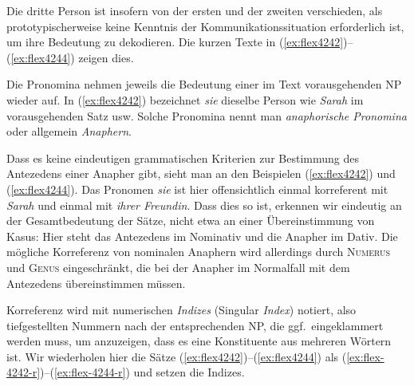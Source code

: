 Die dritte Person ist insofern von der ersten und der zweiten verschieden, als prototypischerweise keine Kenntnis der Kommunikationssituation erforderlich ist, um ihre Bedeutung zu dekodieren.
Die kurzen Texte in (\ref{ex:flex4242})--(\ref{ex:flex4244}) zeigen dies.

\begin{exe}
\end{exe}


Die Pronomina nehmen jeweils die Bedeutung einer im Text vorausgehenden NP wieder auf.
In (\ref{ex:flex4242}) bezeichnet \textit{sie} dieselbe Person wie \textit{Sarah} im vorausgehenden Satz usw.
Solche Pronomina nennt man \textit{anaphorische Pronomina} oder allgemein \textit{Anaphern}.


Dass es keine eindeutigen grammatischen Kriterien zur Bestimmung des Antezedens einer Anapher gibt, sieht man an den Beispielen (\ref{ex:flex4242}) und (\ref{ex:flex4244}).
Das Pronomen \textit{sie} ist hier offensichtlich einmal korreferent mit \textit{Sarah} und einmal mit \textit{ihrer Freundin}.
Dass dies so ist, erkennen wir eindeutig an der Gesamtbedeutung der Sätze, nicht etwa an einer Übereinstimmung von Kasus:
Hier steht das Antezedens im Nominativ und die Anapher im Dativ.
Die mögliche Korreferenz von nominalen Anaphern wird allerdings durch \textsc{Numerus} und \textsc{Genus} eingeschränkt, die bei der Anapher im Normalfall mit dem Antezedens übereinstimmen müssen.

Korreferenz wird mit numerischen \textit{Indizes} (Singular \textit{Index}) notiert, also tiefgestellten Nummern nach der entsprechenden NP, die ggf.\ eingeklammert werden muss, um anzuzeigen, dass es eine Konstituente aus mehreren Wörtern ist.
Wir wiederholen hier die Sätze (\ref{ex:flex4242})--(\ref{ex:flex4244}) als (\ref{ex:flex-4242-r})--(\ref{ex:flex-4244-r}) und setzen die Indizes.

